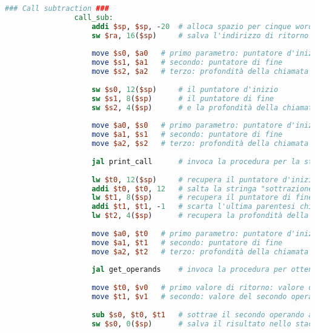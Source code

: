 \begin{center}
\begin{lstlisting}[language=mips, gobble=14, stepnumber=1]
                ### Call subtraction ###
                call_sub:
                    addi $sp, $sp, -20  # alloca spazio per cinque words nello stack frame
                    sw $ra, 16($sp)     # salva l'indirizzo di ritorno nello stack
                    
                    move $s0, $a0   # primo parametro: puntatore d'inizio
                    move $s1, $a1   # secondo: puntatore di fine
                    move $s2, $a2   # terzo: profondità della chiamata
                    
                    sw $s0, 12($sp)     # il puntatore d'inizio
                    sw $s1, 8($sp)      # il puntatore di fine
                    sw $s2, 4($sp)      # e la profondità della chiamata
                    
                    move $a0, $s0   # primo parametro: puntatore d'inizio
                    move $a1, $s1   # secondo: puntatore di fine
                    move $a2, $s2   # terzo: profondità della chiamata
                    
                    jal print_call      # invoca la procedura per la stampa dell'invocazione (con gli stessi parametri)
                    
                    lw $t0, 12($sp)     # recupera il puntatore d'inizio dallo stack
                    addi $t0, $t0, 12   # salta la stringa "sottrazione(" (12 caratteri)
                    lw $t1, 8($sp)      # recupera il puntatore di fine
                    addi $t1, $t1, -1   # scarta l'ultima parentesi chiusa
                    lw $t2, 4($sp)      # recupera la profondità della chiamata
                    
                    move $a0, $t0   # primo parametro: puntatore d'inizio
                    move $a1, $t1   # secondo: puntatore di fine
                    move $a2, $t2   # terzo: profondità della chiamata
                    
                    jal get_operands    # invoca la procedura per ottenere gli operandi
                    
                    move $t0, $v0   # primo valore di ritorno: valore del primo operando
                    move $t1, $v1   # secondo: valore del secondo operando
                    
                    sub $s0, $t0, $t1   # sottrae il secondo operando al primo
                    sw $s0, 0($sp)      # salva il risultato nello stack
                    

\end{lstlisting}
\end{center}
